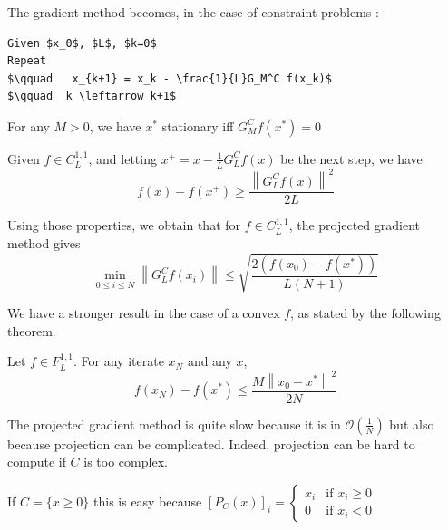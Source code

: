 
The gradient method becomes, in the case of constraint problems :

\begin{lstlisting}[mathescape,caption=Gradient Method - Constrained Problem]
Given $x_0$, $L$, $k=0$
Repeat
$\qquad   x_{k+1} = x_k - \frac{1}{L}G_M^C f(x_k)$
$\qquad  k \leftarrow k+1$
\end{lstlisting}


\begin{property}
For any $M>0$, we have $x^*$ stationary iff $G_M^C f(x^*)=0$
\end{property}

\begin{property}
Given $f \in C^{1,1}_L$, and letting $x^+ = x - \frac{1}{L}G^C_L f(x)$ be the next step, we have
\[
    f(x) - f(x^+) \ge \frac{\left\|G_L^C f(x)\right\|^2}{2L}
\]
\end{property}


\begin{theorem} Using those properties, we obtain that for $f \in C_L^{1,1}$, the projected gradient method gives
\begin{equation*}
\min_{0\leq i \leq N} \left\|G_L^C f(x_i)\right\| \leq \sqrt{\frac{2(f(x_0) - f(x^*))}{L(N+1)}}
\end{equation*}
\end{theorem}

We have a stronger result in the case of a convex $f$, as stated by the following theorem.
\begin{theorem}
Let $f \in F_L^{1,1}$. For any iterate $x_N$ and any $x$,
\begin{equation*}
f(x_N) - f(x^*) \leq \frac{M\left\|x_0 - x^*\right\|^2}{2N}
\end{equation*}
\end{theorem}


The projected gradient method is quite slow because it is in $\mathcal{O}(\frac{1}{N})$ but also because projection can be complicated. Indeed, projection can be hard to compute if $C$ is too complex.

\begin{example}
\begin{leftbar}
If $C=\{x\ge0\}$ this is easy because $[P_C(x)]_i=\left\lbrace
\begin{array}{ll}
x_i & \mbox{if $x_i \ge 0$}\\
0 & \mbox{if $x_i < 0$}
\end{array}
\right.$
\end{leftbar}
\end{example}

